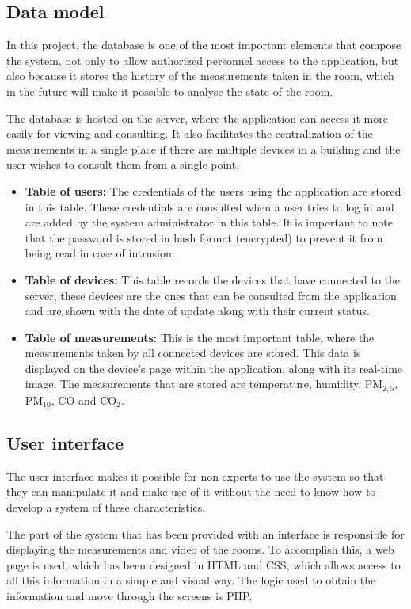 \subsection{Data model}\label{subsec:data-model}
In this project, the database is one of the most important elements that compose the system, not only to allow authorized personnel access to the application, but also because it stores the history of the measurements taken in the room, which in the future will make it possible to analyse the state of the room.

The database is hosted on the server, where the application can access it more easily for viewing and consulting. It also facilitates the centralization of the measurements in a single place if there are multiple devices in a building and the user wishes to consult them from a single point.

\begin{itemize}
	\item \textbf{Table of users:} The credentials of the users using the application are stored in this table. These credentials are consulted when a user tries to log in and are added by the system administrator in this table. It is important to note that the password is stored in hash format (encrypted) to prevent it from being read in case of intrusion.
	\item \textbf{Table of devices:} This table records the devices that have connected to the server, these devices are the ones that can be consulted from the application and are shown with the date of update along with their current status.
	\item \textbf{Table of measurements:} This is the most important table, where the measurements taken by all connected devices are stored. This data is displayed on the device's page within the application, along with its real-time image. The measurements that are stored are temperature, humidity, PM$_{2,5}$, PM$_{10}$, CO and CO$_2$.
\end{itemize}

\subsection{User interface}\label{subsec:user-interface}
The user interface makes it possible for non-experts to use the system so that they can manipulate it and make use of it without the need to know how to develop a system of these characteristics.

The part of the system that has been provided with an interface is responsible for displaying the measurements and video of the rooms. To accomplish this, a web page is used, which has been designed in HTML and CSS, which allows access to all this information in a simple and visual way. The logic used to obtain the information and move through the screens is PHP\@.


